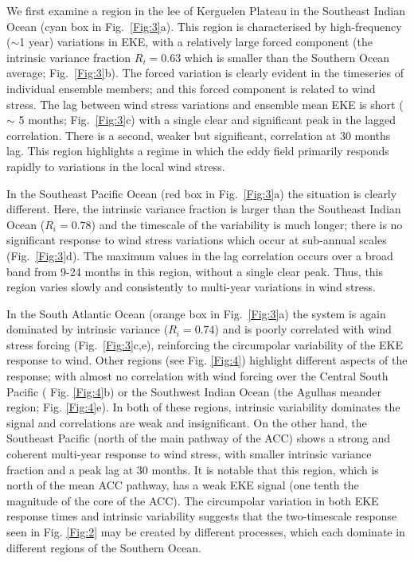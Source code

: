 \documentclass{agujournal2019}
\begin{document}
We first examine a region in the lee of Kerguelen Plateau in the Southeast Indian Ocean (cyan box in Fig.~\ref{Fig:3}a).
This region is characterised by high-frequency ($\sim$1 year) variations in EKE, with a relatively large forced component (the intrinsic variance fraction $R_i = 0.63$ which is smaller than the Southern Ocean average; Fig.~\ref{Fig:3}b).
The forced variation is clearly evident in the timeseries of  individual ensemble members; and this forced component is related to wind stress.
The lag between wind stress variations and ensemble mean EKE is short ($\sim$ 5 months; Fig.~\ref{Fig:3}c) with a single clear  and significant peak in the lagged correlation.
There is a second, weaker but significant, correlation at 30 months lag.
This region highlights a regime in which the eddy field primarily responds rapidly to variations in the local wind stress.

In the Southeast Pacific Ocean (red box in Fig.~\ref{Fig:3}a) the situation is clearly different.
Here, the intrinsic variance fraction is larger than the Southeast Indian Ocean ($R_i=0.78$) and the timescale of the variability is much longer; there is no significant response to wind stress variations which occur at sub-annual scales (Fig.~\ref{Fig:3}d).
The maximum values in the lag correlation occurs over a broad band from 9-24 months in this region, without a single clear peak.
Thus, this region varies slowly and consistently to multi-year variations in wind stress.

In the South Atlantic Ocean (orange box in Fig.~\ref{Fig:3}a) the system is again dominated by intrinsic variance ($R_i=0.74$) and is poorly correlated with wind stress forcing (Fig.~\ref{Fig:3}c,e), reinforcing the circumpolar variability of the EKE response to wind.
Other regions (see Fig. \ref{Fig:4}) highlight different aspects of the response;  with almost no correlation with wind forcing over the Central South Pacific ( Fig. \ref{Fig:4}b) or the Southwest Indian Ocean  (the Agulhas meander region; Fig. \ref{Fig:4}e).
In both of these regions, intrinsic variability dominates the signal and correlations are weak and insignificant. 
On the other hand, the Southeast Pacific (north of the main pathway of the ACC) shows a strong and coherent multi-year response to wind stress, with smaller intrinsic variance fraction and a peak lag at 30 months.
It is notable that this region, which is north of the mean ACC pathway, has a weak EKE signal (one tenth the magnitude of the core of the ACC).
The circumpolar variation in both EKE response times and intrinsic variability suggests that the two-timescale response seen in Fig. \ref{Fig:2} may be created by different processes, which each dominate in different regions of the Southern Ocean.
\end{document}
